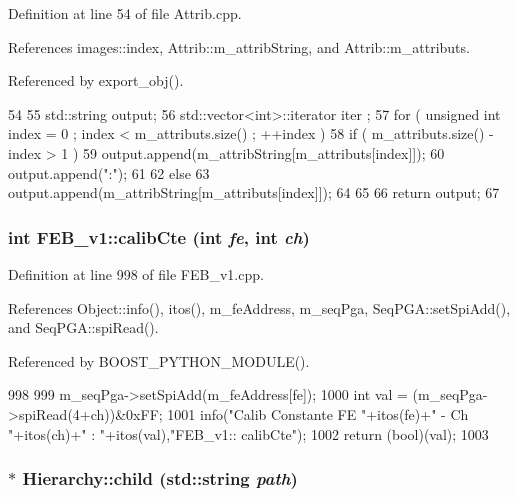 Definition at line 54 of file Attrib.cpp.

References images::index, Attrib::m\_\-attribString, and Attrib::m\_\-attributs.

Referenced by export\_\-obj().


\begin{DoxyCode}
54                             {
55   std::string output;
56   std::vector<int>::iterator iter ;
57   for ( unsigned int index = 0 ; index < m_attributs.size() ; ++index ) {
58     if ( m_attributs.size() - index > 1 ) {
59       output.append(m_attribString[m_attributs[index]]);
60       output.append(":");
61     }
62     else {
63       output.append(m_attribString[m_attributs[index]]);
64     }
65   }
66   return output;
67 }
\end{DoxyCode}
\hypertarget{classFEB__v1_ad3893c8062c75d1f9695c196c95703c7}{
\subsubsection[{calibCte}]{\setlength{\rightskip}{0pt plus 5cm}int FEB\_\-v1::calibCte (int {\em fe}, \/  int {\em ch})}}
\label{classFEB__v1_ad3893c8062c75d1f9695c196c95703c7}


Definition at line 998 of file FEB\_\-v1.cpp.

References Object::info(), itos(), m\_\-feAddress, m\_\-seqPga, SeqPGA::setSpiAdd(), and SeqPGA::spiRead().

Referenced by BOOST\_\-PYTHON\_\-MODULE().


\begin{DoxyCode}
998                                      {
999   m_seqPga->setSpiAdd(m_feAddress[fe]);
1000   int val = (m_seqPga->spiRead(4+ch))&0xFF;
1001   info("Calib Constante FE "+itos(fe)+" - Ch "+itos(ch)+" : "+itos(val),"FEB_v1::
      calibCte");
1002   return (bool)(val);
1003 }
\end{DoxyCode}
\hypertarget{classHierarchy_a1e207f973c694b538bf90107b4868817}{
\subsubsection[{child}]{ $\ast$ Hierarchy::child (std::string {\em path})}}
\label{classHierarchy_a1e207f973c694b538bf90107b4868817}


